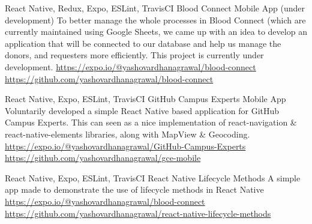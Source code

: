 \begin{cventries}
	\cventry
	{React Native, Redux, Expo, ESLint, TravisCI}
	{Blood Connect Mobile App (under development)}
	{}
	{}
	{To better manage the whole processes in Blood Connect (which are currently maintained using Google Sheets, we came up with an idea to develop an application that will be connected to our database and help us manage the donors, and requesters more efficiently. This project is currently under development. \newline \vspace{1mm}
	\url{https://expo.io/@yashovardhanagrawal/blood-connect} \newline
	\url{https://github.com/yashovardhanagrawal/blood-connect}}
	
	\cventry
	{React Native, Expo, ESLint, TravisCI}
	{GitHub Campus Experts Mobile App}
	{}
	{}
	{Voluntarily developed a simple React Native based application for GitHub Campus Experts. This can seen as a nice implementation of react-navigation \& react-native-elements libraries, along with MapView \& Geocoding. \newline \vspace{1mm}
	\url{https://expo.io/@yashovardhanagrawal/GitHub-Campus-Experts} \newline
	\url{https://github.com/yashovardhanagrawal/gce-mobile}}
	
	\cventry
	{React Native, Expo, ESLint, TravisCI}
	{React Native Lifecycle Methods}
	{}
	{}
	{A simple app made to demonstrate the use of lifecycle methods in React Native \newline \vspace{1mm}
	\url{https://expo.io/@yashovardhanagrawal/blood-connect} \newline
	\url{https://github.com/yashovardhanagrawal/react-native-lifecycle-methods}}
	
\end{cventries}